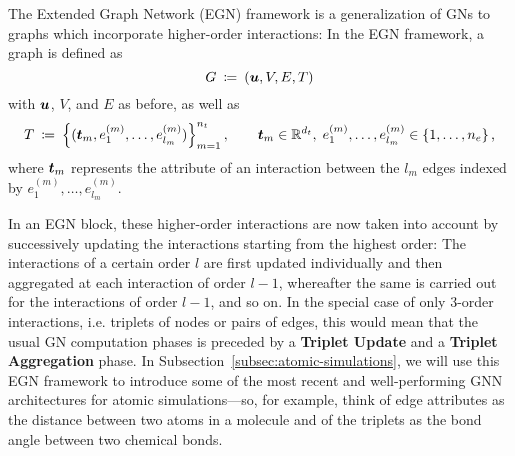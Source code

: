 The Extended Graph Network (EGN) framework \cite[Section 2.1]{https://doi.org/10.48550/arxiv.2203.09697}
 is a generalization of GNs to graphs which 
incorporate higher-order interactions: In the EGN framework, a graph is defined as
\[ G \: \coloneqq \: (\boldsymbol{u}, V, E, T) \]
with $\boldsymbol{u}$, $V$, and $E$ as before, as well as
\begin{equation} 
    T \: \coloneqq \: \left\{(\boldsymbol{t}_m, e_1^{(m)}, \dots, e_{l_m}^{(m)})\right\}_{m=1}^{n_t}, 
    \qquad \boldsymbol{t}_m \in \mathbb{R}^{d_t}, \; 
    e_1^{(m)}, \dots, e_{l_m}^{(m)} \in \left\{1, \dots, n_e\right\} \text{,} 
    \label{eq:higher_order_interact}
\end{equation}
where $\boldsymbol{t}_m$ represents the attribute of an interaction between the $l_m$ edges indexed 
by $e_1^{(m)}, \dots, e_{l_m}^{(m)}$. 

In an EGN block, these higher-order interactions are now taken into account by 
successively updating the interactions starting from the highest order: The interactions
of a certain order $l$ are first updated individually and then aggregated at each
interaction of order $l-1$, whereafter the same is carried out for the interactions
of order $l-1$, and so on. In the special case of only $3$-order interactions, i.e.
triplets of nodes or pairs of edges, this would mean that the usual GN computation 
phases is preceded by a \textbf{Triplet Update} and a \textbf{Triplet Aggregation}
phase. In Subsection~\ref{subsec:atomic-simulations}, we will use this EGN framework
to introduce some of the most recent and well-performing GNN architectures for atomic 
simulations---so, for example, think of edge attributes as the distance between two
atoms in a molecule and of the triplets as the bond angle between two chemical bonds.